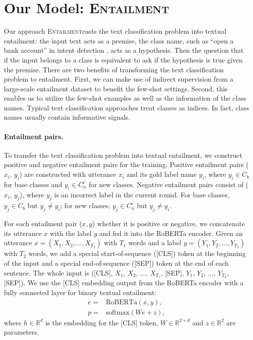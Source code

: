 \documentclass[11pt]{article}
\newcommand{\modelname}{\textsc{Entailment}}
\begin{document}
\section{Our Model: \modelname}
Our approach \modelname\enspace casts the text classification problem into textual entailment: the input text acts as a premise, the class name, such as ``open a bank account'' in intent detection
, acts as a hypothesis. Then the question that if the input belongs to a class is equivalent to ask if the hypothesis is true given the premise. There are two benefits of transforming the text classification problem to entailment. %
First, we can make use of indirect supervision from a large-scale entailment dataset \cite{williams2018broad} to benefit the few-shot settings.
Second, this enables us to utilize the few-shot examples as well as the information of the class names. Typical text classification approaches treat classes as indices. In fact, class names usually contain informative signals.

\paragraph{Entailment pairs.} 
To transfer the text classification problem into textual entailment, we construct positive and negative entailment pairs for the training.
Positive entailment pairs ($x_i$, $y_i$) are constructed with utterance $x_i$ and its gold label name $y_i$, where $y_i\in C_b$ for base classes and $y_i\in C_n^i$ for new classes. Negative entailment pairs consist of ($x_i$, $y_j$), where $y_j$ is an incorrect label in the current round. For base classes, $y_j\in C_b$ but $y_j\neq y_i$; for new classes, $y_j\in C_n^i$ but $y_j \neq y_i$.

For each entailment pair ($x, y$) whether it is positive or negative, we concatenate its utterance $x$ with the label $y$ and fed it into the RoBERTa \cite{liu2019roberta} encoder.
Given an utterance $x = (X_1, X_2, ..., X_{T_2})$ with $T_1$ words and a label $y = (Y_1, Y_2, ..., Y_{T_{2}}) $ with $T_2$ words, we add a special start-of-sequence ([CLS]) token at the beginning of the input and a special end-of-sequence ([SEP]) token at the end of each sentence. The whole input is ([CLS], $X_1$, $X_2$, ..., $X_{T_1}$, [SEP], $Y_1$, $Y_2$, ...,  $Y_{T_{2}}$, [SEP]). We use the [CLS] embedding output from the RoBERTa encoder with a fully connected layer for binary textual entailment:
\begin{align}
    e =& \text{RoBERTa}(x, y),\\
    p =& \text{softmax}(We + z),
\end{align}
where $h \in \mathbb{R}^{d}$ is the embedding for the [CLS] token, $W \in \mathbb{R}^{2 \times d}$ and $z \in \mathbb{R}^2$ are parameters.
\end{document}
